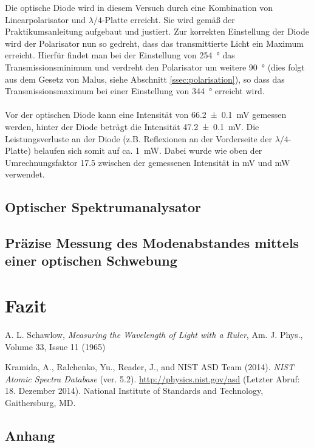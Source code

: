 \documentclass[11pt, a4paper]{article}
\numberwithin{equation}{section}
\begin{document}
Die optische Diode wird in diesem Versuch durch eine Kombination von Linearpolarisator und $\lambda/4$-Platte erreicht.
Sie wird gemäß der Praktikumsanleitung aufgebaut und justiert.
Zur korrekten Einstellung der Diode wird der Polarisator nun so gedreht, dass das transmittierte Licht ein Maximum erreicht.
Hierfür findet man bei der Einstellung von \SI{254}{\degree} das Transmissionsminimum und verdreht den Polarisator um weitere \SI{90}{\degree} (dies folgt aus dem Gesetz von Malus, siehe Abschnitt \ref{ssec:polarisation}), so dass das Transmissionsmaximum bei einer Einstellung von \SI{344}{\degree} erreicht wird.\\
\\
Vor der optischen Diode kann eine Intensität von \SI{66.2+-0.1}{\milli\volt} gemessen werden, hinter der Diode beträgt die Intensität \SI{47.2+-0.1}{\milli\volt}.
Die Leistungsverluste an der Diode (z.B. Reflexionen an der Vorderseite der $\lambda/4$-Platte) belaufen sich somit auf ca. \SI{1}{\milli\watt}.
Dabei wurde wie oben der Umrechnungsfaktor \num{17.5} zwischen der gemessenen Intensität in \si{\milli\volt} und \si{\milli\watt} verwendet.

\subsection{Optischer Spektrumanalysator}

\subsection{Präzise Messung des Modenabstandes mittels einer optischen Schwebung}

\section{Fazit}


\vspace{\fill}
\begin{thebibliography}{9}
	A. L. Schawlow,
	\emph{Measuring the Wavelength of Light with a Ruler},
	Am. J. Phys., Volume 33, Issue 11 (1965)

	Kramida, A., Ralchenko, Yu., Reader, J., and NIST ASD Team (2014).
	\emph{NIST Atomic Spectra Database} (ver. 5.2).
	\url{http://physics.nist.gov/asd} (Letzter Abruf: 18. Dezember 2014).
	National Institute of Standards and Technology, Gaithersburg, MD.
 
\end{thebibliography}

\clearpage

\begin{appendix}
\section{Anhang}


\end{appendix}
\end{document}
